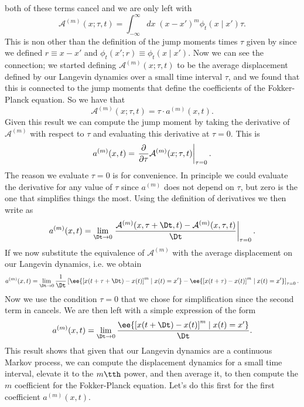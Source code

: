 both of these terms cancel and we are only left with
\begin{equation}
    \mathcal{A}^{(m)}(x; \tau, t) = \int_{-\infty}^\infty dx\; (x - x')^m 
    \phi_t(x \mid x') \tau.
\end{equation}
This is non other than the definition of the jump moments times $\tau$ given by
 since we defined $r \equiv x - x'$ and $\phi_t(x'; r) \equiv
\phi_t(x \mid x')$. Now we can see the connection; we started defining
$\mathcal{A}^{(m)}(x; \tau, t)$ to be the average displacement defined by our
Langevin dynamics over a small time interval $\tau$, and we found that this is
connected to the jump moments that define the coefficients of the Fokker-Planck
equation. So we have that
\begin{equation}
    \mathcal{A}^{(m)}(x; \tau, t) = \tau \cdot a^{(m)}(x, t).
\end{equation}
Given this result we can compute the jump moment by taking the derivative of
$\mathcal{A}^{(m)}$ with respect to $\tau$ and evaluating this derivative at
$\tau = 0$. This is
\begin{equation}
    a^{(m)}(x, t) = \left. {\partial \over \partial \tau} 
    \mathcal{A}^{(m)}(x; \tau, t) \right\vert_{\tau = 0}.
    \label{eq_A_tau_deriv}
\end{equation}
The reason we evaluate $\tau = 0$ is for convenience. In principle we could
evaluate the derivative for any value of $\tau$ since $a^{(m)}$ does not depend
on $\tau$, but zero is the one that simplifies things the most. Using the
definition of derivatives we then write  as
\begin{equation}
    a^{(m)}(x, t) = \lim_{\Dt \rightarrow 0}
    \left.{\mathcal{A}^{(m)}(x, \tau + \Dt, t) - 
    \mathcal{A}^{(m)}(x, \tau, t) \over \Dt} \right\vert_{\tau = 0}.
\end{equation}
If we now substitute the equivalence of $\mathcal{A}^{(m)}$ with the average
displacement on our Langevin dynamics, i.e.  we obtain
\footnotesize
\begin{equation}
    a^{(m)}(x, t) = \lim_{\Dt \rightarrow 0} {1 \over \Dt}
    \left[
    \ee{\left[x(t + \tau + \Dt) - x(t)\right]^m \mid x(t) = x'} -
    \ee{\left[x(t + \tau) - x(t)\right]^m \mid x(t) = x'}
    \right]_{\tau = 0}.
    \label{eq_deriv_average}
\end{equation}
\normalsize
Now we use the condition $\tau = 0$ that we chose for simplification since the
second term in  cancels. We are then left with a simple
expression of the form
\begin{equation}
    a^{(m)}(x, t) = \lim_{\Dt \rightarrow 0}
    {\ee{\left[x(t + \Dt) - x(t)\right]^m \mid x(t) = x'} \over \Dt}.
\end{equation}
This result shows that given that our Langevin dynamics are a continuous Markov
process, we can compute the displacement dynamics for a small time interval,
elevate it to the $m\tth$ power, and then average it, to then compute the $m$
coefficient for the Fokker-Planck equation. Let's do this first for the first
coefficient $a^{(m)}(x, t)$.

